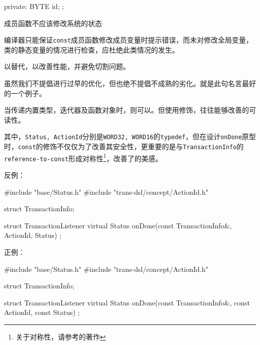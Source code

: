 \begin{content}
\begin{leftbar}
\begin{c++}
{private:
    BYTE id;
};
\end{c++}
\end{leftbar}

\begin{regulation}
成员函数不应该修改系统的状态
\end{regulation}

编译器只能保证\texttt{const}成员函数修改成员变量时提示错误，而未对修改全局变量，类的静态变量的情况进行检查，应杜绝此类情况的发生。

\begin{regulation}
以替代，以改善性能，并避免切割问题。
\end{regulation}

虽然我们不提倡进行过早的优化，但也绝不提倡不成熟的劣化。就是此句名言最好的一个例子。

\begin{advise}
当传递内置类型，迭代器及函数对象时，则可以。但使用修饰，往往能够改善的可读性。
\end{advise}

其中，\texttt{Status, ActionId}分别是\texttt{WORD32, WORD16}的\texttt{typedef}，但在设计\texttt{onDone}原型时，\texttt{const}的修饰不仅仅为了改善其安全性，更重要的是与\texttt{TransactionInfo}的\texttt{reference-to-const}形成对称性\footnote{关于对称性，请参考的著作}，改善了的美感。

反例：
\begin{leftbar}
\begin{c++}
#include "base/Status.h"
#include "trans-dsl/concept/ActionId.h"

struct TransactionInfo;

struct TransactionListener
{
    virtual Status onDone(const TransactionInfo&, ActionId, Status) {}
};
\end{c++}
\end{leftbar}

正例：
\begin{leftbar}
\begin{c++}
#include "base/Status.h"
#include "trans-dsl/concept/ActionId.h"

struct TransactionInfo;

struct TransactionListener
{
    virtual Status onDone(const TransactionInfo&, const ActionId, const Status) {}
};
\end{c++}
\end{leftbar}


\end{content}

